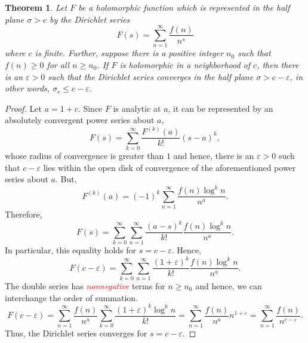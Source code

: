 \documentclass[12pt]{article}
\theoremstyle{thmstyle}
\newtheorem{theorem}{Theorem}[section]
\theoremstyle{defstyle}
\newcommand{\caution}[1]{\textcolor{red}{\textit{#1}}}
\renewcommand{\le}{\leqslant}
\renewcommand{\ge}{\geqslant}
\begin{document}
\begin{theorem}
    Let $F$ be a holomorphic function which is represented in the half plane $\sigma > c $ by the Dirichlet series 
    \begin{equation*}
        F(s) = \sum_{n = 1}^\infty\frac{f(n)}{n^s}
    \end{equation*}
    where $c$ is finite. Further, suppose there is a positive integer $n_0$ such that $f(n)\ge 0$ for all $n\ge n_0$. If $F$ is holomorphic in a neighborhood of $c$, then there is an $\varepsilon > 0$ such that the Dirichlet series converges in the half plane $\sigma > c - \varepsilon$, in other words, $\sigma_c\le c -\varepsilon$.
\end{theorem}
\begin{proof}
    Let $a = 1 + c$. Since $F$ is analytic at $a$, it can be represented by an absolutely convergent power series about $a$, 
    \begin{equation*}
        F(s) = \sum_{k = 0}^\infty\frac{F^{(k)}(a)}{k!}(s - a)^k,
    \end{equation*}
    whose radius of convergence is greater than $1$ and hence, there is an $\varepsilon > 0$ such that $c - \varepsilon$ lies within the open disk of convergence of the aforementioned power series about $a$. But, 
    \begin{equation*}
        F^{(k)}(a) = (-1)^k \sum_{n = 1}^\infty\frac{f(n)\log^k n}{n^a}.
    \end{equation*}
    Therefore, 
    \begin{equation*}
        F(s) = \sum_{k = 0}^\infty\sum_{n = 1}^\infty\frac{(a - s)^k}{k!}\frac{f(n)\log^k n}{n^a}.
    \end{equation*}
    In particular, this equality holds for $s = c - \varepsilon$. Hence, 
    \begin{equation*}
        F(c - \varepsilon) = \sum_{k = 0}^\infty\sum_{n = 1}^\infty\frac{(1 + \varepsilon)^k}{k!}\frac{f(n)\log^k n}{n^a}.
    \end{equation*}
    The double series has \caution{nonnegative} terms for $n\ge n_0$ and hence, we can interchange the order of summation. 
    \begin{equation*}
        F(c - \varepsilon) = \sum_{n = 1}^\infty\frac{f(n)}{n^a}\sum_{k = 0}^\infty\frac{(1 + \varepsilon)^k \log^k n}{k!} = \sum_{n = 1}^\infty\frac{f(n)}{n^a} n^{1 + \varepsilon} = \sum_{n = 1}^\infty\frac{f(n)}{n^{c - \varepsilon}}.
    \end{equation*}
    Thus, the Dirichlet series converges for $s = c - \varepsilon$.
\end{proof}
\end{document}

